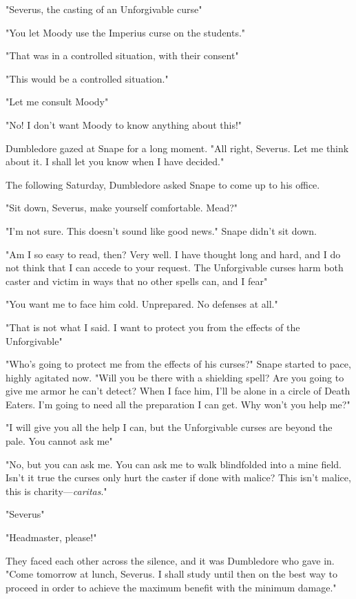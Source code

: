 "Severus, the casting of an Unforgivable curse{\el}"

"You let Moody use the Imperius curse on the students."

"That was in a controlled situation, with their consent{\el}"

"This would be a controlled situation."

"Let me consult Moody{\el}"

"No! I don't want Moody to know anything about this!"

Dumbledore gazed at Snape for a long moment. "All right, Severus. Let me think about it. I shall let you know when I have decided."

The following Saturday, Dumbledore asked Snape to come up to his office.

"Sit down, Severus, make yourself comfortable. Mead?"

"I'm not sure. This doesn't sound like good news." Snape didn't sit down.

"Am I so easy to read, then? Very well. I have thought long and hard, and I do not think that I can accede to your request. The Unforgivable curses harm both caster and victim in ways that no other spells can, and I fear{\el}"

"You want me to face him cold. Unprepared. No defenses at all."

"That is not what I said. I want to protect you from the effects of the Unforgivable{\el}"

"Who's going to protect me from the effects of his curses?" Snape started to pace, highly agitated now. "Will you be there with a shielding spell? Are you going to give me armor he can't detect? When I face him, I'll be alone in a circle of Death Eaters. I'm going to need all the preparation I can get. Why won't you help me?"

"I will give you all the help I can, but the Unforgivable curses are beyond the pale. You cannot ask me{\el}"

"No, but you can ask me. You can ask me to walk blindfolded into a mine field. Isn't it true the curses only hurt the caster if done with malice? This isn't malice, this is charity—\emph{caritas}."

"Severus{\el}"

"Headmaster, please!"

They faced each other across the silence, and it was Dumbledore who gave in. "Come tomorrow at lunch, Severus. I shall study until then on the best way to proceed in order to achieve the maximum benefit with the minimum damage."

